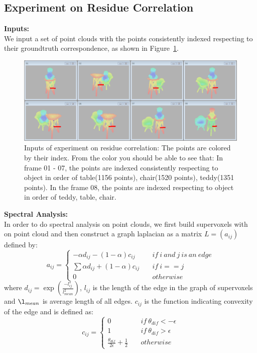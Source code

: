 \subsection{Experiment on Residue Correlation}
\label{subsec:exp:res}
\textbf{Inputs:}\\
We input a set of point clouds with the points consistently indexed respecting to their groundtruth correspondence, as shown in Figure~\ref{fig:input_for_exp_res}.\\
\begin{figure}
	\centering
	\includegraphics[width=\textwidth]{images/exp_res/inputs.png}
	\caption{Inputs of experiment on residue correlation: The points are colored by their index. From the color you should be able to see that: In frame 01 - 07, the points are indexed consistently respecting to object in order of table(1156 points), chair(1520 points), teddy(1351 points). In the frame 08, the points are indexed respecting to object in order of teddy, table, chair.}
	\label{fig:input_for_exp_res}
\end{figure}
\textbf{Spectral Analysis:}\\
In order to do spectral analysis on point clouds, we first build supervoxels with \cite{Supervoxels} on point cloud and then construct a graph laplacian as a matrix $L=(a_{ij})$ defined by:
$$ a_{ij}=\left\{
\begin{aligned}
-\alpha d_{ij}-(1-\alpha) c_{ij} &~&if~i~and~j~is~an~edge\\
\sum\alpha d_{ij}+(1-\alpha) c_{ij} &~&if~i==j\\
0 &~&otherwise
\end{aligned}
\right.
$$
where $d_{ij}=\exp(\frac{-l_{ij}^2}{l_{mean}^2})$, $l_{ij}$ is the length of the edge in the graph of supervoxels and $\l_{mean}$ is average length of all edges.  $c_{ij}$ is the function indicating convexity of the edge and is defined as:
$$ c_{ij}=\left\{
\begin{aligned}
0 &~&if~\theta_{dif}<-\epsilon\\
1 &~&if~\theta_{dif}>\epsilon\\
\frac{\theta_{dif}}{2\epsilon}+\frac{1}{2} &~&otherwise
\end{aligned}
\right.
$$
